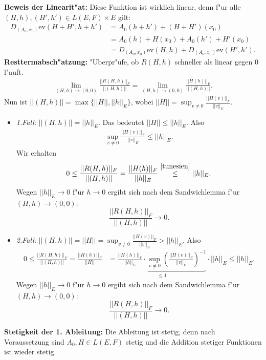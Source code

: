 \documentclass[a4paper, landscape,twocolumn,fontsize=8pt]{scrartcl}
\theoremstyle{plain}
\begin{document}
\textbf{Beweis der Linearit"at:} Diese Funktion ist wirklich linear, denn f"ur alle $(H,h),(H',h') \in L(E,F) \times E$ gilt:
\begin{align*}
    D_{(A_0,x_0)}\mathrm{ev}(H+H',h+h') &= A_0(h+h') + (H+H')(x_0)\\
    &= A_0(h) + H(x_0)  + A_0(h') + H'(x_0)\\
    &= D_{(A_0,x_0)}\mathrm{ev}(H,h) + D_{(A_0,x_0)}\mathrm{ev}(H',h').
\end{align*}
\textbf{Resttermabsch"atzung:} "Uberpr"ufe, ob $R(H,h)$ schneller als linear gegen $0$ l"auft.
\begin{align*}
    \lim_{(H,h) \to (0,0)} \frac{||R(H,h)||_F}{||(H,h)||} = \lim_{(H,h) \to (0,0)} \frac{||H(h)||_F}{||(H,h)||}.
\end{align*}
Nun ist $||(H,h)|| = \max\{||H||, ||h||_E\}$, wobei $||H|| = \sup_{v \neq 0} \frac{||H(v)||_F}{||v||_E}$.
\begin{itemize}
    \item \emph{1.Fall:} $||(H,h)|| = ||h||_E$. Das bedeutet $||H|| \leq ||h||_E$. Also 
    \begin{align}\label{tunesien}
        \sup_{v \neq 0} \frac{||H(v)||_F}{||v||_E} \leq ||h||_E.
    \end{align}
    Wir erhalten 
    \[
        0 \leq \frac{||R(H,h)||_F}{||(H,h)||}  = \frac{||H(h)||_F}{||h||_E} \overset{\eqref{tunesien}}{\leq} ||h||_E.
    \]
    Wegen $||h||_E \to 0$ f"ur $h \to 0$ ergibt sich nach dem Sandwichlemma f"ur $(H,h) \to (0,0)$:
    \[
        \frac{||R(H,h)||_F}{||(H,h)||} \to 0.
    \]
    
    
    \item \emph{2.Fall:} $||(H,h)|| = ||H|| = \sup_{v \neq 0} \frac{||H(v)||_F}{||v||_E} > ||h||_E$. Also 
    \begin{align*}
        0 \leq \frac{||R(H,h)||_F}{||(H,h)||}  = \frac{||H(h)||_F}{||H||} &= \underbrace{\frac{||H(h)||_F}{||h||_E} \cdot \sup_{v \neq 0} \left(\frac{||H(v)||_F}{||v||_E}\right )^{-1}}_{\leq 1}  \cdot ||h||_E 
         \leq ||h||_E.
    \end{align*}
    Wegen $||h||_E \to 0$ f"ur $h \to 0$ ergibt sich nach dem Sandwichlemma f"ur $(H,h) \to (0,0)$:
    \[
        \frac{||R(H,h)||_F}{||(H,h)||} \to 0.
    \]
\end{itemize}

\textbf{Stetigkeit der 1. Ableitung:} Die Ableitung ist stetig, denn nach Voraussetzung sind $A_0,H \in L(E,F)$ stetig und die Addition stetiger Funktionen ist wieder stetig.\\
\end{document}
